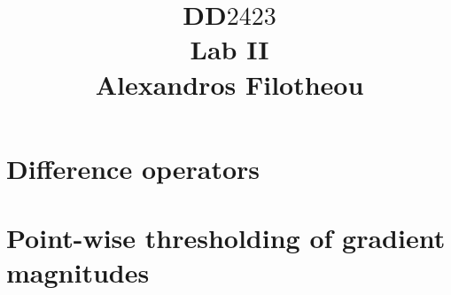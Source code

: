 \documentclass[oneside,12pt]{article}
\title{DD$2423$ \\ Lab II \\ Alexandros Filotheou}
\date{}
\begin{document}
	\maketitle
	
	\section{Difference operators}
			
		\newpage		
	
	\section{Point-wise thresholding of gradient magnitudes}
		
		\newpage

			
\end{document}
